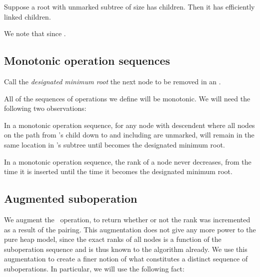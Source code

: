 \begin{cor}
Suppose a root with unmarked subtree of size  has  children. Then it has  efficiently linked children. 
\end{cor}

We note that  since .


\subsection{Monotonic operation sequences} 

Call the \emph{designated minimum root} the next node to be removed in an \opEm.
\begin{fullonly}
\end{fullonly}
All of the sequences of operations we define will be monotonic. We will need the following two observations:


\begin{obs} In a monotonic operation sequence, for any node  with descendent  where all nodes on the path from 's child down to and including   are unmarked,  will remain in the same location in 's subtree until  becomes the designated minimum root.
\end {obs}

\begin{obs}
In a monotonic operation sequence, the rank of a node never decreases, from the time it is inserted until the time it becomes the designated minimum root.
\end{obs}






\subsection{Augmented suboperation} 


We augment  the \cdot\ operation, to return whether or not the rank was incremented as a result of the pairing. This augmentation does not give any more power to the pure heap model, since the exact ranks of all nodes is a function of the suboperation sequence and is thus known to the algorithm already.
We use this augmentation to create a finer notion of what constitutes a distinct sequence of suboperations. In particular, we will use the following fact:

